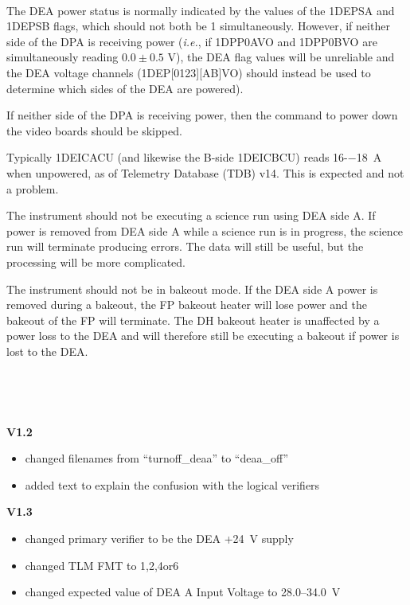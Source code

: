 \documentclass[11pt]{article}
\begin{document}

\normalsize
{} \\
\normalsize

The DEA power status is normally indicated by the values of the 1DEPSA and
1DEPSB flags, which should not both be 1 simultaneously.
However, if neither side of the DPA is receiving power
({\it i.e.}, if 1DPP0AVO and 1DPP0BVO are simultaneously reading $0.0 \pm 0.5$ V),
the DEA flag values will be unreliable and the DEA voltage
channels (1DEP[0123][AB]VO) should instead be used to determine which
sides of the DEA are powered).

If neither side of the DPA is receiving power, then the command to power down the 
video boards should be skipped.

Typically 1DEICACU (and likewise the B-side 1DEICBCU) reads 16-−18~A when 
unpowered, as of Telemetry Database (TDB) v14. This is expected and not a problem.

The instrument should not be executing a science run using DEA side A. 
If power is removed from DEA side A while a science run is in progress, the science 
run will terminate producing errors. The data will still be useful, but the processing 
will be more complicated.

The instrument should not be in bakeout mode. If the DEA side A power is 
removed during a bakeout, the FP bakeout heater will lose power and the bakeout of 
the FP will terminate. The DH bakeout heater is unaffected by a power loss to the 
DEA and will therefore still be executing a bakeout if power is lost to the DEA.

\vspace{0.15in}
\normalsize
{} \\
\normalsize

\normalsize
{} \\
\normalsize

{\bf V1.2}
\begin{itemize}
\item changed filenames from ``turnoff\_deaa'' to
``deaa\_off''
\item added text to explain the confusion with the logical verifiers
\end{itemize}

{\bf V1.3}
\begin{itemize}
\item changed primary verifier to be the DEA +24~V supply
\item changed TLM FMT to 1,2,4or6
\item changed expected value of DEA A Input Voltage to 28.0--34.0~V
\end{itemize}
\end{document}
